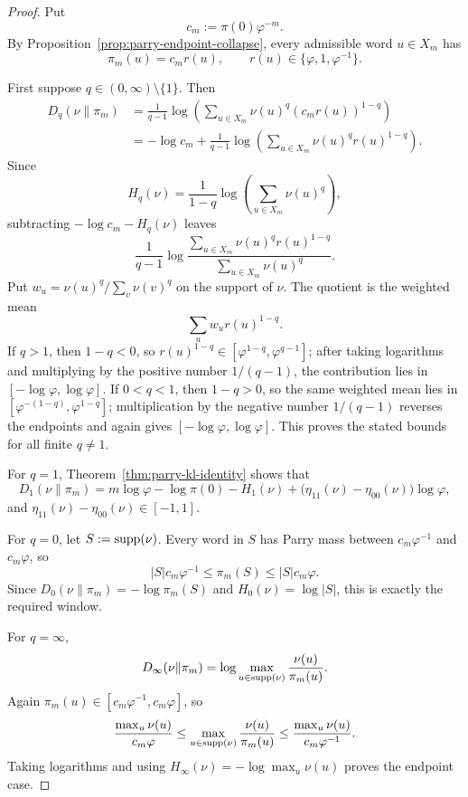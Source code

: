 \begin{proof}
Put
\[
c_m:=\pi(0)\varphi^{-m}.
\]
By Proposition~\ref{prop:parry-endpoint-collapse}, every admissible word
\(u\in X_m\) has
\[
\pi_m(u)=c_m r(u),
\qquad
r(u)\in\{\varphi,1,\varphi^{-1}\}.
\]

First suppose \(q\in(0,\infty)\setminus\{1\}\). Then
\[
\begin{aligned}
D_q(\nu\|\pi_m)
&=
\frac{1}{q-1}
\log\!\left(
\sum_{u\in X_m}\nu(u)^q(c_mr(u))^{1-q}
\right)\\
&=
-\log c_m
+
\frac{1}{q-1}
\log\!\left(\sum_{u\in X_m}\nu(u)^q r(u)^{1-q}\right).
\end{aligned}
\]
Since
\[
H_q(\nu)=\frac{1}{1-q}\log\!\left(\sum_{u\in X_m}\nu(u)^q\right),
\]
subtracting \(-\log c_m-H_q(\nu)\) leaves
\[
\frac{1}{q-1}
\log
\frac{\sum_{u\in X_m}\nu(u)^q r(u)^{1-q}}
{\sum_{u\in X_m}\nu(u)^q}.
\]
Put \(w_u=\nu(u)^q/\sum_v\nu(v)^q\) on the support of \(\nu\).  The quotient
is the weighted mean
\[
\sum_{u} w_u r(u)^{1-q}.
\]
If \(q>1\), then \(1-q<0\), so
\(r(u)^{1-q}\in[\varphi^{1-q},\varphi^{q-1}]\); after taking logarithms and
multiplying by the positive number \(1/(q-1)\), the contribution lies in
\([-\log\varphi,\log\varphi]\).  If \(0<q<1\), then \(1-q>0\), so the same
weighted mean lies in \([\varphi^{-(1-q)},\varphi^{1-q}]\); multiplication by
the negative number \(1/(q-1)\) reverses the endpoints and again gives
\([-\log\varphi,\log\varphi]\).  This proves the stated bounds for all finite
\(q\ne1\).

For \(q=1\), Theorem~\ref{thm:parry-kl-identity} shows that
\[
D_1(\nu\|\pi_m)
=
m\log\varphi-\log\pi(0)-H_1(\nu)
+
\bigl(\eta_{11}(\nu)-\eta_{00}(\nu)\bigr)\log\varphi,
\]
and \(\eta_{11}(\nu)-\eta_{00}(\nu)\in[-1,1]\).

For \(q=0\), let \(S:=\operatorname{supp}(\nu)\). Every word in \(S\) has Parry mass between
\(c_m\varphi^{-1}\) and \(c_m\varphi\), so
\[
|S|c_m\varphi^{-1}
\le
\pi_m(S)
\le
|S|c_m\varphi.
\]
Since \(D_0(\nu\|\pi_m)=-\log\pi_m(S)\) and \(H_0(\nu)=\log|S|\), this is
exactly the required window.

For \(q=\infty\),
\[
D_\infty(\nu\|\pi_m)
=
\log\max_{u\in\operatorname{supp}(\nu)}\frac{\nu(u)}{\pi_m(u)}.
\]
Again \(\pi_m(u)\in[c_m\varphi^{-1},c_m\varphi]\), so
\[
\frac{\max_u \nu(u)}{c_m\varphi}
\le
\max_{u\in\operatorname{supp}(\nu)}\frac{\nu(u)}{\pi_m(u)}
\le
\frac{\max_u \nu(u)}{c_m\varphi^{-1}}.
\]
Taking logarithms and using \(H_\infty(\nu)=-\log\max_u\nu(u)\) proves the
endpoint case.
\end{proof}

